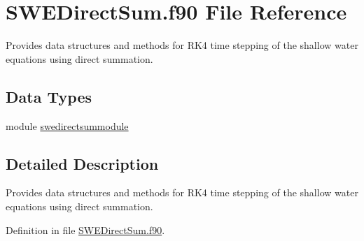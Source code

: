\hypertarget{SWEDirectSum_8f90}{\section{S\+W\+E\+Direct\+Sum.\+f90 File Reference}
\label{SWEDirectSum_8f90}
}


Provides data structures and methods for R\+K4 time stepping of the shallow water equations using direct summation.  


\subsection*{Data Types}
\begin{DoxyCompactItemize}
\item 
module \hyperlink{classswedirectsummodule}{swedirectsummodule}
\end{DoxyCompactItemize}


\subsection{Detailed Description}
Provides data structures and methods for R\+K4 time stepping of the shallow water equations using direct summation. 



Definition in file \hyperlink{SWEDirectSum_8f90_source}{S\+W\+E\+Direct\+Sum.\+f90}.

